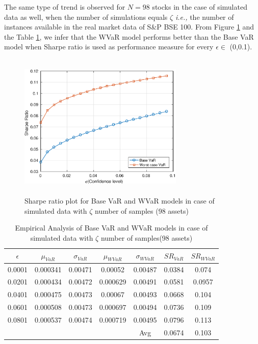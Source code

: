 The same type of trend is observed for $N=98$ stocks in the case of simulated data as well, when the number of simulations equals $\zeta$ \textit{i.e.,} the number of instances available in the real market data of S\&P BSE 100. From Figure \ref{fig:5.5} and the Table \ref{tab:5.5}, we infer that the WVaR model performs better than the Base VaR model when Sharpe ratio is used as performance measure for every $\epsilon \in$ (0,0.1).
\begin{figure}[!h]
\centering
\includegraphics[height=7.0cm,width=0.7\textwidth]{VaR/bse100_simulated/sr_exact_cheb.eps}
\caption{Sharpe ratio plot for Base VaR and WVaR models in case of simulated data with $\zeta$ number of samples (98 assets)}
\label{fig:5.5}
\end{figure}

\begin{table}[!h]
\centering
\captionsetup{justification=centering}
\begin{tabular}{||c|c|c|c|c|c|c||}
\hline
$\epsilon$ & $\mu_{VaR}$ & $\sigma_{VaR}$ & $\mu_{WVaR}$ & $\sigma_{WVaR}$ & $SR_{VaR}$ & $SR_{WVaR}$\\
\hline
0.0001 & 0.000341 & 0.00471 & 0.00052 & 0.00487 & 0.0384 & 0.074 \\
0.0201 & 0.000434 & 0.00472 & 0.000629 & 0.00491 & 0.0581 & 0.0957 \\
0.0401 & 0.000475 & 0.00473 & 0.00067 & 0.00493 & 0.0668 & 0.104 \\
0.0601 & 0.000508 & 0.00473 & 0.000697 & 0.00494 & 0.0736 & 0.109 \\
0.0801 & 0.000537 & 0.00474 & 0.000719 & 0.00495 & 0.0796 & 0.113 \\ 
\hline
& & & & Avg & 0.0674 & 0.103 \\
\hline
\end{tabular}
\caption{Empirical Analysis of Base VaR and WVaR models in case of simulated data with $\zeta$ number of samples(98 assets)}
\label{tab:5.5}
\end{table}

